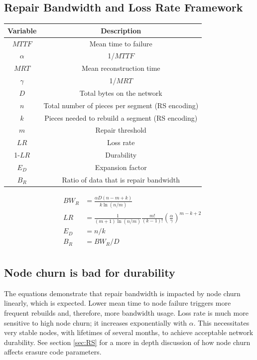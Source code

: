 \documentclass[8pt,fleqn,openany]{book}
\begin{document}
\subsection{Repair Bandwidth and Loss Rate Framework}

\begin{center}
\begin{tabular}{| c | c |}\hline
Variable & Description\\\hline
$MTTF$ & Mean time to failure \\
$\alpha$ & 1/$MTTF$\\
$MRT$ & Mean reconstruction time \\
$\gamma$ & 1/$MRT$\\
$D$&Total bytes on the network\\
$n$ & Total number of pieces per segment (RS encoding)\\
$k$ & Pieces needed to rebuild a segment (RS encoding)\\
$m$ & Repair threshold\\
$LR$ & Loss rate\\
1-$LR$ & Durability\\
$E_D$ & Expansion factor\\
$B_R$ & Ratio of data that is repair bandwidth\\
\hline
\end{tabular}
\end{center}

\begin{align*}
&&BW_R&=\frac{\alpha D(n-m+k)}{k\ln(n/m)}&\\
&&LR&=\frac{1}{(m+1)\ln(n/m)}\frac{m!}{(k-1)!}\left(\frac{\alpha}{\gamma}\right)^{m-k+2}&\\
&&E_D&=n/k&\\
&&B_R&=BW_R/D&\\
\end{align*}

\subsection{Node churn is bad for durability}\label{sec:bandwidth-space-limits}

The equations demonstrate that repair bandwidth is impacted by node churn
linearly, which is expected.
Lower mean time to node failure triggers more frequent rebuilds and,
therefore, more bandwidth usage.
Loss rate is much more sensitive to high node churn; it increases
exponentially with $\alpha$.
This necessitates very stable nodes, with lifetimes of several months, to
achieve acceptable network durability.
See section \ref{sec:RS} for a more in depth discussion of how node churn
affects erasure code parameters.
\end{document}
